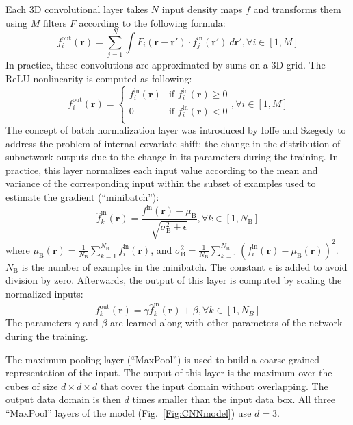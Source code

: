 Each 3D convolutional layer takes $N$ input density maps $f$ and
transforms them using $M$ filters $F$ according to the following
formula:
$$
f^\text{out}_i (\mathbf{r}) = \sum^{N}_{j=1} \int F_i (\mathbf{r} - \mathbf{r'}) \cdot f^\text{in}_j(\mathbf{r'}) ~d\mathbf{r'}, \forall i \in [1,M]
$$
In practice, these convolutions are approximated by sums on a 3D grid.
The ReLU nonlinearity is computed as following:
$$
f^\text{out}_i (\mathbf{r}) = \begin{cases}
               f^\text{in}_i(\mathbf{r}) &\text{if } f^\text{in}_i(\mathbf{r})\geq 0\\
               0                         &\text{if } f^\text{in}_i(\mathbf{r})<0\\
            \end{cases}, \forall i \in [1,M]
$$
The concept of batch normalization layer was introduced by Ioffe and
Szegedy \cite{ioffe2015batch} to address the problem of internal
covariate shift: the change in the distribution of subnetwork outputs
due to the change in its parameters during the training. In practice,
this layer normalizes each input value according to the
mean and variance of the corresponding input within the subset of
examples used to estimate the gradient (``minibatch''):
$$
\hat{f}^\text{in}_k(\mathbf{r}) = \frac{f^\text{in}(\mathbf{r}) - \mu_\text{B}}{\sqrt{\sigma^{2}_\text{B} + \epsilon}}, \forall k \in [1,N_\text{B}]
$$
where $\mu_\text{B}(\mathbf{r})
= \frac{1}{N_\text{B}} \sum_{k=1}^{N_\text{B}}
f^\text{in}_i(\mathbf{r})$, and $\sigma^{2}_\text{B}
= \frac{1}{N_\text{B}} \sum_{k=1}^{N_\text{B}} \left(
f^\text{in}_i(\mathbf{r}) - \mu_\text{B}
(\mathbf{r}) \right)^2$. $N_\text{B}$ is the number of examples in the
minibatch. The constant $\epsilon$ is added to avoid division by
zero. Afterwards, the output of this layer is computed by scaling the
normalized inputs:
$$
f^\text{out}_k(\mathbf{r}) = \gamma \hat{f}^\text{in}_k(\mathbf{r}) + \beta, \forall k \in [1,N_B]
$$
The parameters $\gamma$ and $\beta$ are learned along with other
parameters of the network during the training.

The maximum pooling layer (``MaxPool'') is used to build a
coarse-grained representation of the input. The output of this layer
is the maximum over the cubes of size $d \times d \times d$ that cover
the input domain without overlapping.  The output data domain is then
$d$ times smaller than the input data box. All three ``MaxPool''
layers of the model (Fig.\ \ref{Fig:CNNmodel}) use $d=3$.

